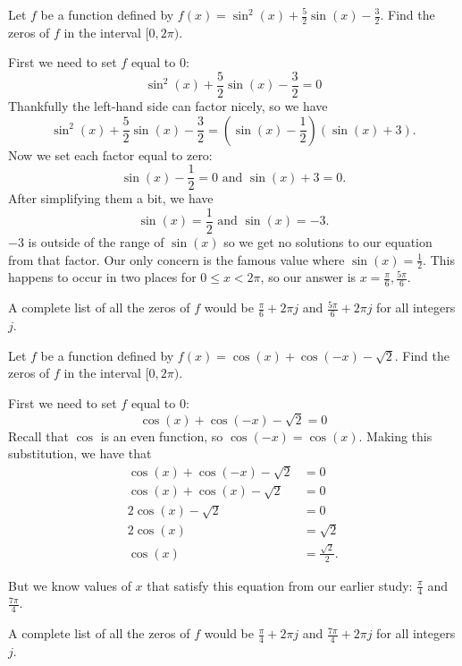 \documentclass{ximera}
\begin{document}
\begin{example}
Let $f$ be a function defined by $f(x)=\sin^2(x)+\frac{5}{2}\sin(x)-\frac{3}{2}$. Find the zeros of $f$ in the interval $[0, 2\pi)$.
\begin{explanation}
First we need to set $f$ equal to $0$:\\
$$\sin^2(x)+\frac{5}{2}\sin(x)-\frac{3}{2}=0$$
Thankfully the left-hand side can factor nicely, so we have\\
\[
\sin^2(x)+\frac{5}{2}\sin(x)-\frac{3}{2}= \left(\sin(x)-\frac{1}{2}\right)(\sin(x)+3).
\]
Now we set each factor equal to zero:
\[
\sin(x)-\frac{1}{2}=0 \text{ and } \sin(x)+3 =0.
\]
After simplifying them a bit, we have
\[
\sin(x) = \frac{1}{2} \text{ and } \sin(x)=-3.
\]
$-3$ is outside of the range of $\sin(x)$ so we get no solutions to our equation from that factor. Our only concern is the famous value where $\sin(x) = \frac{1}{2}$. This happens to occur in two places for $0\leq x < 2\pi$, so our answer is $x=\frac{\pi}{6},\frac{5\pi}{6}$.

A complete list of all the zeros of $f$ would be $\frac{\pi}{6} + 2\pi j$ and $\frac{5\pi}{6} + 2\pi j$ for all integers $j$. 
\end{explanation}
\end{example}

\begin{example}
Let $f$ be a function defined by $f(x)=\cos(x) + \cos(-x) - \sqrt{2}$. Find the zeros of $f$ in the interval $[0, 2\pi)$.
\begin{explanation}
First we need to set $f$ equal to $0$:
$$\cos(x) + \cos(-x) - \sqrt{2}=0$$
Recall that $\cos$ is an even function, so $\cos(-x) = \cos(x)$. Making this substitution, we have that 
\begin{align*}
\cos(x) + \cos(-x) - \sqrt{2} & = 0 \\
\cos(x) + \cos(x) - \sqrt{2} & = 0 \\
2\cos(x) - \sqrt{2} & = 0 \\
2\cos(x) & = \sqrt{2} \\
\cos(x) & = \frac{\sqrt{2}}{2}.
\end{align*}

But we know values of $x$ that satisfy this equation from our earlier study: $\frac{\pi}{4}$ and $\frac{7\pi}{4}$. 

A complete list of all the zeros of $f$ would be $\frac{\pi}{4} + 2\pi j$ and $\frac{7\pi}{4} + 2\pi j$ for all integers $j$. 
\end{explanation}
\end{example}
\end{document}
